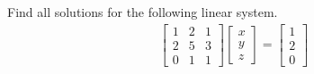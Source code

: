 \begin{exmp}
\label{exmp:mulsol}
Find all solutions for the following linear system.
\begin{align*}
\begin{bmatrix}
1 & 2 & 1 \\
2 & 5 & 3 \\
0 & 1 & 1 
\end{bmatrix}
\begin{bmatrix}
x \\
y \\
z
\end{bmatrix}
=
\begin{bmatrix}
1 \\
2 \\
0
\end{bmatrix}   
\end{align*}
\end{exmp}
